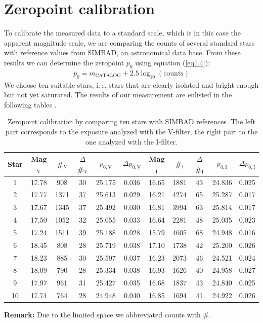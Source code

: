 \section{Zeropoint calibration}\label{sec:zeropoint}
To calibrate the measured data to a standard scale, which is in this case the apparent magnitude scale, we are comparing the counts of several standard stars with reference values from SIMBAD, an astronomical data base. From these results we can determine the zeropoint $p_0$ using equation (\ref{eq1.4}): 
	\begin{align*}
		p_0 = m_{\text{CATALOG}} + 2.5\log_{10}(\text{counts})
	\end{align*}
	We choose ten suitable stars, i.\,e. stars that are clearly isolated and bright enough but not yet saturated. 
\newpage
The results of our measurement are enlisted in the following tables
.
	
	\begin{table}[H]
\setlength{\tabcolsep}{2mm}
\renewcommand{\arraystretch}{1.5}
\begin{adjustbox}{width=\textwidth} 
\begin{tabular}{c|c c c c c|c c c c c}

Star & Mag$_{\text{V}}$ & \#$_{\text{V}}$ & $\Delta$\#$_{\text{V}}$ & $p_{0,\text{V}}$ &$\Delta p_{0,\text{V}}$ & Mag$_{\text{I}}$ & \#$_{\text{I}}$ & $\Delta$\#$_{\text{I}}$ & $p_{0,\text{I}}$ &$\Delta p_{0,\text{I}}$\\ \hline 
1 & 17.78 & 908 & 30 & 25.175 & 0.036 & 16.65 & 1881 & 43 & 24.836 & 0.025 \\
2 & 17.77 & 1371 & 37 & 25.613 & 0.029 & 16.21 & 4274 & 65 & 25.287 & 0.017 \\
3 & 17.67 & 1345 & 37 & 25.492 & 0.030 & 16.81 & 3994 & 63 & 25.814 & 0.017 \\
4 & 17.50 & 1052 & 32 & 25.055 & 0.033 & 16.64 & 2281 & 48 & 25.035 & 0.023 \\
5 & 17.24 & 1511 & 39 & 25.188& 0.028 & 15.79 & 4605 & 68 & 24.948 & 0.016 \\
6 & 18.45 & 808 & 28 & 25.719 & 0.038 & 17.10 & 1738 & 42 &  25.200 & 0.026 \\
7 & 18.23 & 885 & 30 & 25.597 & 0.037 & 16.23 & 2073 & 46 &  24.521 & 0.024 \\
8 & 18.09 & 790 & 28 & 25.334 & 0.038 & 16.93 & 1626 & 40 & 24.958 & 0.027 \\
9 & 17.97 & 961 & 31 & 25.427 & 0.035 & 16.68 & 1837 & 43 &  24.840 & 0.025 \\
10 & 17.74 & 764 & 28 & 24.948 & 0.040 & 16.85 &  1694 & 41 & 24.922 & 0.026 \\

\end{tabular}
\end{adjustbox}
\caption{\label{tab:2} Zeropoint calibration by comparing ten stars with SIMBAD references. The left part corresponds to the exposure analyzed with the V-filter, the right part to the one analyzed with the I-filter.}
\end{table}
\textbf{Remark:} Due to the limited space we abbreviated counts with $\#$. \\
	
